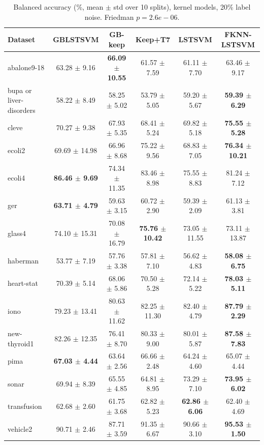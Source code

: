 \begin{table}[t]
\centering\small
\caption{Balanced accuracy (\%, mean $\pm$ std over 10 splits), kernel models, 20\% label noise. Friedman $p = 2.6e-06$.}
\begin{tabular}{lccccc}
\toprule
Dataset & GBLSTSVM & GB-keep & Keep+T7 & LSTSVM & FKNN-LSTSVM \\
\midrule
abalone9-18 & 63.28 $\pm$ 9.16 & \textbf{66.09 $\pm$ 10.55} & 61.57 $\pm$ 7.59 & 61.11 $\pm$ 7.70 & 63.46 $\pm$ 9.17 \\
bupa or liver-disorders & 58.22 $\pm$ 8.49 & 58.25 $\pm$ 5.02 & 53.79 $\pm$ 5.05 & 59.20 $\pm$ 5.67 & \textbf{59.39 $\pm$ 6.29} \\
cleve & 70.27 $\pm$ 9.38 & 67.93 $\pm$ 5.35 & 68.41 $\pm$ 5.24 & 69.82 $\pm$ 5.18 & \textbf{75.55 $\pm$ 5.28} \\
ecoli2 & 69.69 $\pm$ 14.98 & 66.96 $\pm$ 8.68 & 75.22 $\pm$ 9.56 & 68.83 $\pm$ 7.05 & \textbf{76.34 $\pm$ 10.21} \\
ecoli4 & \textbf{86.46 $\pm$ 9.69} & 74.34 $\pm$ 11.35 & 83.46 $\pm$ 8.98 & 75.55 $\pm$ 8.83 & 81.24 $\pm$ 7.12 \\
ger & \textbf{63.71 $\pm$ 4.79} & 59.63 $\pm$ 3.15 & 60.72 $\pm$ 2.90 & 59.39 $\pm$ 2.09 & 61.13 $\pm$ 3.81 \\
glass4 & 74.10 $\pm$ 15.31 & 70.08 $\pm$ 16.79 & \textbf{75.76 $\pm$ 10.42} & 73.05 $\pm$ 11.55 & 73.11 $\pm$ 13.87 \\
haberman & 53.77 $\pm$ 7.19 & 57.76 $\pm$ 3.38 & 57.81 $\pm$ 7.10 & 56.62 $\pm$ 4.83 & \textbf{58.08 $\pm$ 6.75} \\
heart-stat & 70.39 $\pm$ 5.14 & 68.06 $\pm$ 5.86 & 70.50 $\pm$ 5.28 & 72.14 $\pm$ 5.22 & \textbf{78.03 $\pm$ 5.11} \\
iono & 79.23 $\pm$ 13.41 & 80.63 $\pm$ 11.62 & 82.25 $\pm$ 11.30 & 82.40 $\pm$ 4.79 & \textbf{87.79 $\pm$ 2.29} \\
new-thyroid1 & 82.26 $\pm$ 12.35 & 76.41 $\pm$ 8.70 & 80.33 $\pm$ 9.00 & 80.01 $\pm$ 5.87 & \textbf{87.58 $\pm$ 7.83} \\
pima & \textbf{67.03 $\pm$ 4.44} & 63.64 $\pm$ 2.56 & 66.66 $\pm$ 2.48 & 64.24 $\pm$ 4.60 & 65.07 $\pm$ 4.44 \\
sonar & 69.94 $\pm$ 8.39 & 65.55 $\pm$ 4.85 & 64.81 $\pm$ 8.95 & 73.29 $\pm$ 7.10 & \textbf{73.95 $\pm$ 6.02} \\
transfusion & 62.68 $\pm$ 2.60 & 61.75 $\pm$ 3.68 & 62.82 $\pm$ 5.23 & \textbf{62.86 $\pm$ 6.06} & 62.40 $\pm$ 4.69 \\
vehicle2 & 90.71 $\pm$ 2.46 & 87.71 $\pm$ 3.59 & 91.35 $\pm$ 6.67 & 90.66 $\pm$ 3.10 & \textbf{95.53 $\pm$ 1.50} \\

\end{tabular}
\end{table}

